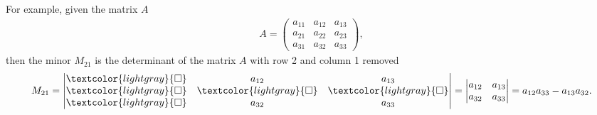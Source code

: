 \documentclass[letterpaper,10pt,english]{jupyterBook}
\begin{document}
\sphinxAtStartPar
For example, given the matrix \(A\)
\begin{equation*}
\begin{split} A = \begin{pmatrix}
    a_{11} & a_{12} & a_{13} \\
    a_{21} & a_{22} & a_{23} \\
    a_{31} & a_{32} & a_{33}
\end{pmatrix}, \end{split}
\end{equation*}
\sphinxAtStartPar
then the minor \(M_{21}\) is the determinant of the matrix \(A\) with row 2 and column 1 removed
\begin{equation*}
\begin{split} M_{21} = \begin{vmatrix}
    \textcolor{lightgray}{\square} & a_{12} & a_{13} \\
    \textcolor{lightgray}{\square} & \textcolor{lightgray}{\square} & \textcolor{lightgray}{\square} \\
    \textcolor{lightgray}{\square} & a_{32} & a_{33}
\end{vmatrix}
= \begin{vmatrix}
    a_{12} & a_{13} \\
    a_{32} & a_{33}
\end{vmatrix}
= a_{12}a_{33} - a_{13}a_{32}. \end{split}
\end{equation*}\label{_pages/1.4_Determinants:minor-example}
\end{document}
